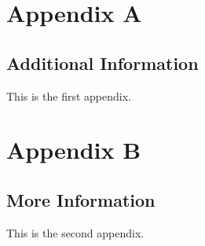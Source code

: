 \documentclass[12pt, oneside]{book}
\begin{document}
\begin{appendices}
\chapter{Appendix A}
\section{Additional Information}
This is the first appendix.

\chapter{Appendix B}
\section{More Information}
This is the second appendix.
\end{appendices}

\clearpage
\printindex

\clearpage
\printbibliography
\end{document}
